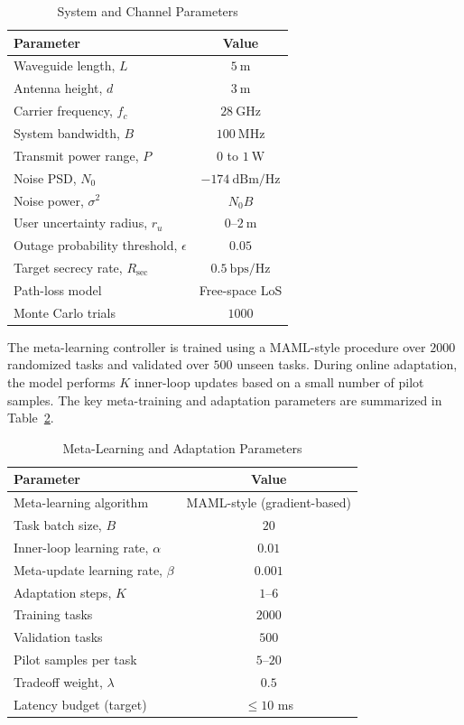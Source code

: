 \documentclass[journal,10pt]{IEEEtran}
\begin{document}
\begin{table}[t]
\centering
\caption{System and Channel Parameters}
\label{tab:sys_params}
\begin{tabular}{l c}
\hline
\textbf{Parameter} & \textbf{Value} \\ \hline
Waveguide length, $L$ & $5~\mathrm{m}$ \\
Antenna height, $d$ & $3~\mathrm{m}$ \\
Carrier frequency, $f_c$ & $28~\mathrm{GHz}$ \\
System bandwidth, $B$ & $100~\mathrm{MHz}$ \\
Transmit power range, $P$ & $0$ to $1~\mathrm{W}$ \\
Noise PSD, $N_0$ & $-174~\mathrm{dBm/Hz}$ \\
Noise power, $\sigma^2$ & $N_0 B$ \\
User uncertainty radius, $r_u$ & $0$--$2~\mathrm{m}$ \\
Outage probability threshold, $\epsilon$ & $0.05$ \\
Target secrecy rate, $R_{\mathrm{sec}}$ & $0.5~\mathrm{bps/Hz}$ \\
Path-loss model & Free-space LoS \\
Monte Carlo trials & $1000$ \\
\hline
\end{tabular}
\end{table}

The meta-learning controller is trained using a MAML-style procedure over $2000$ randomized tasks and validated over $500$ unseen tasks. During online adaptation, the model performs $K$ inner-loop updates based on a small number of pilot samples. The key meta-training and adaptation parameters are summarized in Table~\ref{tab:algo_params}.

\begin{table}[t]
\centering
\caption{Meta-Learning and Adaptation Parameters}
\label{tab:algo_params}
\begin{tabular}{l c}
\hline
\textbf{Parameter} & \textbf{Value} \\ \hline
Meta-learning algorithm & MAML-style (gradient-based) \\
Task batch size, $B$ & $20$ \\
Inner-loop learning rate, $\alpha$ & $0.01$ \\
Meta-update learning rate, $\beta$ & $0.001$ \\
Adaptation steps, $K$ & $1$--$6$ \\
Training tasks & $2000$ \\
Validation tasks & $500$ \\
Pilot samples per task & $5$--$20$ \\
Tradeoff weight, $\lambda$ & $0.5$ \\
Latency budget (target) & $\leq 10$ ms \\
\hline
\end{tabular}
\end{table}
\end{document}
